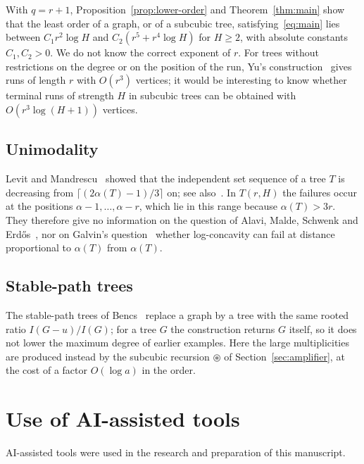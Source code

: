 \documentclass[11pt]{amsart}
\theoremstyle{definition}
\theoremstyle{remark}
\numberwithin{equation}{section}
\newcommand{\cs}{\circledast}
\begin{document}
With $q=r+1$, Proposition~\ref{prop:lower-order} and Theorem~\ref{thm:main} show that the least order of a graph, or of a subcubic tree, satisfying~\eqref{eq:main} lies between $C_1r^2\log H$ and $C_2(r^5+r^4\log H)$ for $H\ge2$, with absolute constants $C_1,C_2>0$. We do not know the correct exponent of $r$. For trees without restrictions on the degree or on the position of the run, Yu's construction~\cite[Corollary~1.3]{Yu} gives runs of length $r$ with $O(r^3)$ vertices; it would be interesting to know whether terminal runs of strength $H$ in subcubic trees can be obtained with $O(r^3\log(H+1))$ vertices.

\subsection{Unimodality}\label{sec:unimodality}
Levit and Mandrescu~\cite{LM} showed that the independent set sequence of a tree $T$ is decreasing from $\lceil(2\alpha(T)-1)/3\rceil$ on; see also~\cite[Section~3]{Gal}. In $T(r,H)$ the failures occur at the positions $\alpha-1,\dots,\alpha-r$, which lie in this range because $\alpha(T)>3r$. They therefore give no information on the question of Alavi, Malde, Schwenk and Erd\H{o}s~\cite{AMSE}, nor on Galvin's question~\cite[Question~3.1]{Gal} whether log-concavity can fail at distance proportional to $\alpha(T)$ from $\alpha(T)$.

\subsection{Stable-path trees}
The stable-path trees of Bencs~\cite[Definition~2.2 and Theorem~2.3]{Bencs} replace a graph by a tree with the same rooted ratio $I(G-u)/I(G)$; for a tree $G$ the construction returns $G$ itself, so it does not lower the maximum degree of earlier examples. Here the large multiplicities are produced instead by the subcubic recursion $\cs$ of Section~\ref{sec:amplifier}, at the cost of a factor $O(\log a)$ in the order.

\section*{Use of AI-assisted tools}
AI-assisted tools were used in the research and preparation of this manuscript.
\end{document}
